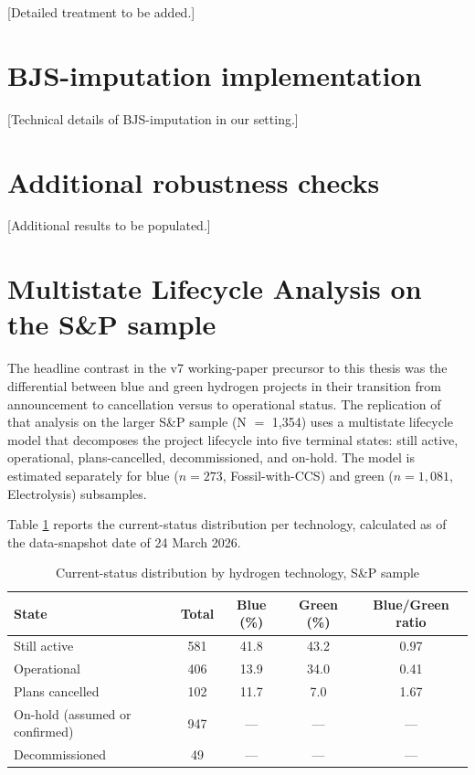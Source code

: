 [Detailed treatment to be added.]

\section{BJS-imputation implementation}
\label{app:bjs_implementation}

[Technical details of BJS-imputation in our setting.]

\section{Additional robustness checks}
\label{app:robustness}

[Additional results to be populated.]


\section{Multistate Lifecycle Analysis on the S\&P sample}
\label{app:multistate}

The headline contrast in the v7 working-paper precursor to this thesis was the differential between blue and green hydrogen projects in their transition from announcement to cancellation versus to operational status. The replication of that analysis on the larger S\&P sample (N $=$ 1,354) uses a multistate lifecycle model that decomposes the project lifecycle into five terminal states: still active, operational, plans-cancelled, decommissioned, and on-hold. The model is estimated separately for blue ($n = 273$, Fossil-with-CCS) and green ($n = 1{,}081$, Electrolysis) subsamples.

Table \ref{tab:app-multistate} reports the current-status distribution per technology, calculated as of the data-snapshot date of 24 March 2026.

\begin{table}[!htbp]
\centering
\caption{Current-status distribution by hydrogen technology, S\&P sample}
\label{tab:app-multistate}
\begin{tabular}{lcccc}
\toprule
State & Total & Blue (\%) & Green (\%) & Blue/Green ratio \\
\midrule
Still active & 581 & 41.8 & 43.2 & 0.97 \\
Operational & 406 & 13.9 & 34.0 & 0.41 \\
Plans cancelled & 102 & 11.7 & 7.0 & 1.67 \\
On-hold (assumed or confirmed) & 947 & --- & --- & --- \\
Decommissioned & 49 & --- & --- & --- \\
\bottomrule
\end{tabular}
\end{table}

